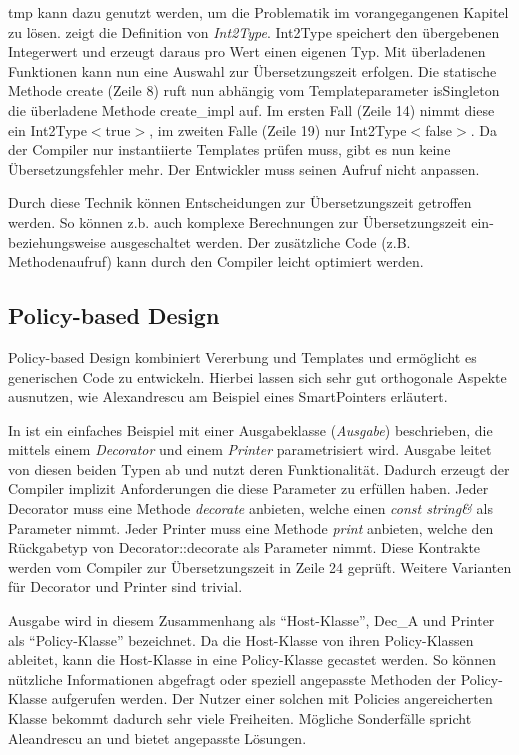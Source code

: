 \ac{tmp} kann dazu genutzt werden, um die Problematik im vorangegangenen Kapitel zu lösen.  zeigt die Definition von \emph{Int2Type}. Int2Type speichert den übergebenen Integerwert und erzeugt daraus pro Wert einen eigenen Typ. Mit überladenen Funktionen kann nun eine Auswahl zur Übersetzungszeit erfolgen. Die statische Methode create (Zeile 8) ruft nun abhängig vom Templateparameter isSingleton die überladene Methode create\_impl auf. Im ersten Fall (Zeile 14) nimmt diese ein Int2Type$<$true$>$, im zweiten Falle (Zeile 19) nur Int2Type$<$false$>$. Da der Compiler nur instantiierte Templates prüfen muss, gibt es nun keine Übersetzungsfehler mehr. Der Entwickler muss seinen Aufruf nicht anpassen.



Durch diese Technik können Entscheidungen zur Übersetzungszeit getroffen werden. So können z.b. auch komplexe Berechnungen zur Übersetzungszeit ein- beziehungsweise ausgeschaltet werden. Der zusätzliche Code (z.B. Methodenaufruf) kann durch den Compiler leicht optimiert werden.

\subsection{Policy-based Design}
Policy-based Design kombiniert Vererbung und Templates und ermöglicht es generischen Code zu entwickeln. Hierbei lassen sich sehr gut orthogonale Aspekte ausnutzen, wie Alexandrescu am Beispiel eines SmartPointers erläutert.

In  ist ein einfaches Beispiel mit einer Ausgabeklasse (\emph{Ausgabe}) beschrieben, die mittels einem \emph{Decorator} und einem \emph{Printer} parametrisiert wird. Ausgabe leitet von diesen beiden Typen ab und nutzt deren Funktionalität. Dadurch erzeugt der Compiler implizit Anforderungen die diese Parameter zu erfüllen haben. Jeder Decorator muss eine Methode \emph{decorate} anbieten, welche einen \emph{const string\&} als Parameter nimmt. Jeder Printer muss eine Methode \emph{print} anbieten, welche den Rückgabetyp von Decorator::decorate als Parameter nimmt. Diese Kontrakte werden vom Compiler zur Übersetzungszeit in Zeile 24 geprüft. Weitere Varianten für Decorator und Printer sind trivial.

Ausgabe wird in diesem Zusammenhang als ``Host-Klasse'', Dec\_A und Printer als ``Policy-Klasse'' bezeichnet. Da die Host-Klasse von ihren Policy-Klassen ableitet, kann die Host-Klasse in eine Policy-Klasse gecastet werden. So können nützliche Informationen abgefragt oder speziell angepasste Methoden der Policy-Klasse aufgerufen werden. Der Nutzer einer solchen mit Policies angereicherten Klasse bekommt dadurch sehr viele Freiheiten. Mögliche Sonderfälle spricht Aleandrescu an und bietet angepasste Lösungen.

